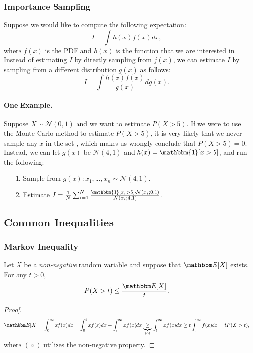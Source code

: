     \subsubsection{Importance Sampling}
        Suppose we would like to compute the following expectation:
            \begin{equation}
                I = \int h(x) f(x) d x,
            \end{equation}
        where $f(x)$ is the PDF and $h(x)$ is the function that we are interested in.
        Instead of estimating $I$ by directly sampling from $f(x)$, we can estimate $I$ by sampling from a different distribution $g(x)$ as follows:
            \begin{equation}\label{eq:importance_sampling}
                I = \int \frac{h(x) f(x)}{g(x)}  d g(x).
            \end{equation}
            
        \paragraph{One Example.}
        Suppose $X \sim \mathcal{N}(0, 1)$ and we want to estimate $P(X > 5)$.
        If we were to use the Monte Carlo method to estimate $P(X>5)$, it is very likely that we never sample any $x$ in the set , which makes us wrongly conclude that $P(X > 5) = 0$.
        Instead, we can let $g(x)$ be $\mathcal{N}(4, 1)$ and $h(x) = \mathbbm{1}[x > 5]$, and run the following:
            \begin{itemize}
                \item[1.] Sample from $g(x): x_1, \ldots, x_n \sim \mathcal{N}(4, 1) $.
                \item[2.] Estimate $I = \frac{1}{\ndata} \sum_{i=1}^{\ndata}{\frac{\mathbbm{1}[x_i > 5] \cdot \mathcal{N}(x_i; 0, 1)}{\mathcal{N}(x_i; 4, 1)}}$.
            \end{itemize}
            
\subsection{Common Inequalities}
    \subsubsection{Markov Inequality}
     Let $X$ be a \emph{non-negative} random variable and suppose that $\E[X]$ exists. 
     For any $t > 0$,
        \begin{equation}
            P(X > t) \le \frac{\E[X]}{t}.
        \end{equation}
    \begin{proof}
        \begin{equation}
            \E[X] = \int_{0}^{\infty}{ x f(x)} dx = \int_{0}^{t} x f(x) dx + \int_{t}^{\infty} x f(x) dx \underbrace{\ge}_{(\diamond)} \int_{t}^{\infty} x f(x) dx \ge t \int_{t}^{\infty} f(x) dx = t P(X > t),
        \end{equation}
    where $(\diamond)$ utilizes the non-negative property.
    \end{proof}
    
